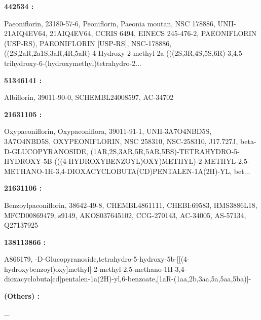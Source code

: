 \documentclass[
]{article}
\begin{document}
\begin{center}\begin{tcolorbox}[colback=gray!10, colframe=gray!50, width=0.9\linewidth, arc=1mm, boxrule=0.5pt]
\textbf{
442534
:}

\vspace{0.5em}

    Paeoniflorin, 23180-57-6, Peoniflorin, Paeonia moutan,
NSC 178886, UNII-21AIQ4EV64, 21AIQ4EV64, CCRIS 6494, EINECS
245-476-2, PAEONIFLORIN (USP-RS), PAEONIFLORIN [USP-RS],
NSC-178886,
((2S,2aR,2a1S,3aR,4R,5aR)-4-Hydroxy-2-methyl-2a-(((2S,3R,4S,5S,6R)-3,4,5-trihydroxy-6-(hydroxymethyl)tetrahydro-2...

\vspace{2em}


\textbf{
51346141
:}

\vspace{0.5em}

    Albiflorin, 39011-90-0, SCHEMBL24008597, AC-34702

\vspace{2em}


\textbf{
21631105
:}

\vspace{0.5em}

    Oxypaeoniflorin, Oxypaeoniflora, 39011-91-1,
UNII-3A7O4NBD5S, 3A7O4NBD5S, OXYPEONIFLORIN, NSC 258310,
NSC-258310, J17.727J, beta-D-GLUCOPYRANOSIDE,
(1AR,2S,3AR,5R,5AR,5BS)-TETRAHYDRO-5-HYDROXY-5B-(((4-HYDROXYBENZOYL)OXY)METHYL)-2-METHYL-2,5-METHANO-1H-3,4-DIOXACYCLOBUTA(CD)PENTALEN-1A(2H)-YL,
bet...

\vspace{2em}


\textbf{
21631106
:}

\vspace{0.5em}

    Benzoylpaeoniflorin, 38642-49-8, CHEMBL4861111,
CHEBI:69583, HMS3886L18, MFCD00869479, s9149,
AKOS037645102, CCG-270143, AC-34005, AS-57134, Q27137925

\vspace{2em}


\textbf{
138113866
:}

\vspace{0.5em}

    A866179,
-D-Glucopyranoside,tetrahydro-5-hydroxy-5b-[[(4-hydroxybenzoyl)oxy]methyl]-2-methyl-2,5-methano-1H-3,4-dioxacyclobuta[cd]pentalen-1a(2H)-yl,6-benzoate,[1aR-(1aa,2b,3aa,5a,5aa,5ba)]-

\vspace{2em}


\textbf{
(Others)
:}

\vspace{0.5em}

    ...

\vspace{2em}
\end{tcolorbox}
\end{center}
\end{document}
